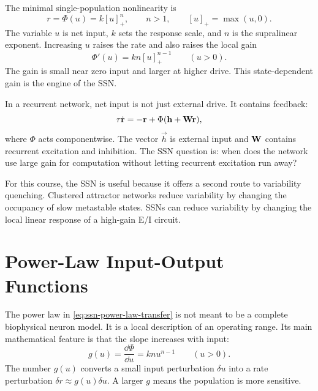 The minimal single-population nonlinearity is
%
\begin{equation}
  r
  =
  \Phi(u)
  =
  k[u]_{+}^{n},
  \qquad
  n>1,
  \qquad
  [u]_{+}=\max(u,0).
  \label{eq:ssn-power-law-transfer}
\end{equation}
%
The variable $u$ is net input, $k$ sets the response scale, and $n$ is the supralinear exponent. Increasing $u$ raises the rate and also raises the local gain
%
\begin{equation}
  \Phi'(u)
  =
  kn[u]_{+}^{n-1}
  \qquad (u>0).
  \label{eq:ssn-gain-power-law}
\end{equation}
%
The gain is small near zero input and larger at higher drive. This state-dependent gain is the engine of the SSN.

In a recurrent network, net input is not just external drive. It contains feedback:
%
\begin{equation}
  \tau \dot{\mathbf{r}}
  =
  -\mathbf{r}
  +
  \Phi(\mathbf{h}+\mathbf{W}\mathbf{r}),
  \label{eq:ssn-recurrent-rate}
\end{equation}
%
where $\Phi$ acts componentwise. The vector $\vec h$ is external input and $\mathbf{W}$ contains recurrent excitation and inhibition. The SSN question is: when does the network use large gain for computation without letting recurrent excitation run away?

For this course, the SSN is useful because it offers a second route to variability quenching. Clustered attractor networks reduce variability by changing the occupancy of slow metastable states. SSNs can reduce variability by changing the local linear response of a high-gain E/I circuit.

\section{Power-Law Input-Output Functions}
\label{sec:ssn-power-law-input-output-functions}

The power law in \eqref{eq:ssn-power-law-transfer} is not meant to be a complete biophysical neuron model. It is a local description of an operating range. Its main mathematical feature is that the slope increases with input:
%
\begin{equation}
  g(u)
  =
  \frac{\dd \Phi}{\dd u}
  =
  knu^{n-1}
  \qquad (u>0).
  \label{eq:ssn-local-gain}
\end{equation}
%
The number $g(u)$ converts a small input perturbation $\delta u$ into a rate perturbation $\delta r \approx g(u)\delta u$. A larger $g$ means the population is more sensitive.

